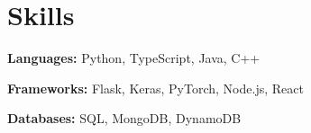 \section{Skills}
 \resumeSubHeadingListStart
   \item{
     \textbf{Languages: }{Python, TypeScript, Java, C++}
   } \vspace{-6px}
   \item{
      \textbf{Frameworks: }{Flask, Keras, PyTorch, Node.js, React}
   } \vspace{-6px}
   \item{
      \textbf{Databases: }{SQL, MongoDB, DynamoDB}
   }
 \resumeSubHeadingListEnd